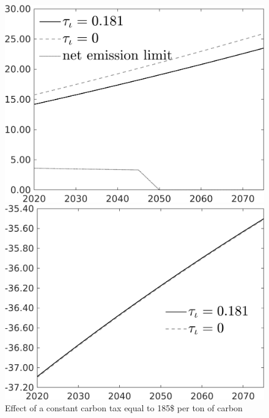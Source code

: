 \begin{figure}[h!!]
	\centering
	\caption{Effect of a constant carbon tax equal to 185\$ per ton of carbon }\label{fig:Leveltauf_nsk0_xgr0_know}		
\begin{minipage}[]{0.32\textwidth}
	\includegraphics[width=1\textwidth]{../../codding_model/own_basedOnFried/optimalPol_010922_revision/figures/all_13Sept22/CompTauf_bytaul_Reg0_Emnet_spillover0_nsk0_xgr0_knspil0_sep0_LFlimit0_emsbase0_countec0_GovRev0_etaa0.79_lgd1.png}
\end{minipage}	
\begin{minipage}[]{0.32\textwidth}
\includegraphics[width=1\textwidth]{../../codding_model/own_basedOnFried/optimalPol_010922_revision/figures/all_13Sept22/PerdifNoTauf_regime0_CompTaul_F_spillover0_nsk0_xgr0_knspil0_sep0_LFlimit0_emsbase0_countec0_GovRev0_etaa0.79_lgd1.png}

\end{minipage}
\end{figure}
